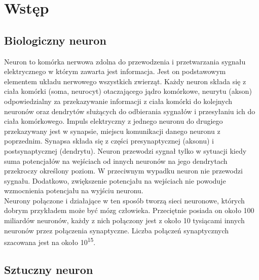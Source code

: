 
\chapter{Wstęp}

\section{Biologiczny neuron}

Neuron to komórka nerwowa zdolna do przewodzenia i przetwarzania sygnału
elektrycznego w którym zawarta jest informacja. Jest on podstawowym elementem
układu nerwowego wszystkich zwierząt. Każdy neuron składa się z
ciała komórki (soma, neurocyt) otaczającego jądro komórkowe, neurytu (akson)
odpowiedzialny za przekazywanie informacji z ciała komórki do kolejnych neuronów
oraz dendrytów służących do odbierania sygnałów i przesyłaniu ich do ciała
komórkowego. Impuls elektryczny z jednego neuronu do drugiego przekazywany jest
w synapsie, miejscu komunikacji danego neuronu z poprzednim. Synapsa składa się
z części presynaptycznej (aksonu) i postsynaptycznej (dendrytu). Neuron
przewodzi sygnał tylko w sytuacji kiedy suma potencjałów na wejściach od innych
neuronów na jego dendrytach przekroczy określony poziom. W przeciwnym wypadku
neuron nie przewodzi sygnału. Dodatkowo, zwiększenie potencjału na wejściach
nie powoduje wzmocnienia potencjału na wyjściu neuronu. \\
Neurony połączone i działające w ten sposób tworzą sieci neuronowe, których
dobrym przykładem może być mózg człowieka. Przeciętnie posiada on około 100
miliardów neuronów, każdy z nich połączony jest z około 10 tysiącami innych
neuronów przez połączenia synaptyczne. Liczba połączeń synaptycznych szacowana
jest na około 10\textsuperscript{15}.

\section{Sztuczny neuron}

